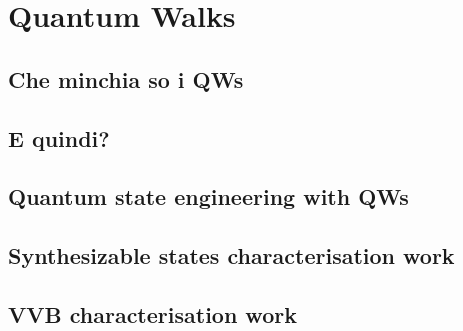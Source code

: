 
\chapter{Quantum Walks}
\label{Section:ChapAbbr}



\section{Che minchia so i QWs}
\section{E quindi?}
\section{Quantum state engineering with QWs}
\section{Synthesizable states characterisation work}
\section{VVB characterisation work}


\label{Section:ChapAbbr:Introduction}

